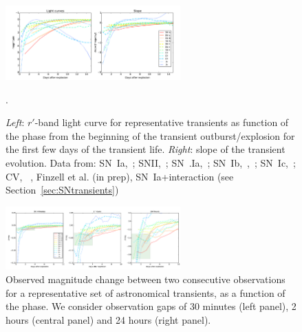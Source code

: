 \begin{figure}[hbt]
\centerline{
\includegraphics[width=0.6\textwidth]{figs/transients/earlyslope.pdf}
}
\caption{\emph{Left}: $r'$-band light curve for representative transients as function of the phase from the beginning of the transient outburst/explosion for the first few days of the transient life. \emph{Right}: slope of the transient evolution. Data from: SN~Ia,~\citet{Olling15}; SNII,~\citet{Rubin16}; SN~.Ia,~\citet{Shen10}; SN~Ib,~\citet{Valenti11},~\citet{Cao13}; SN~Ic,~\citet{Mazzali02}; CV, ~\citet{Sokoloski13}, Finzell et al. (in prep), SN~Ia+interaction (see Section~\ref{sec:SNtransients})}.
\label{fig:earlyslope}
\end{figure}

\begin{figure}[hbt]
\centerline{
\includegraphics[width=0.6\textwidth]{figs/transients/earlyrise.pdf}
}
\caption{Observed magnitude change between two consecutive observations for a representative set of astronomical transients, as a function of the phase. We consider observation gaps of 30 minutes  (left panel), 2 hours (central panel) and 24 hours (right panel). 
}
\label{fig:earlyrise}
\end{figure}
